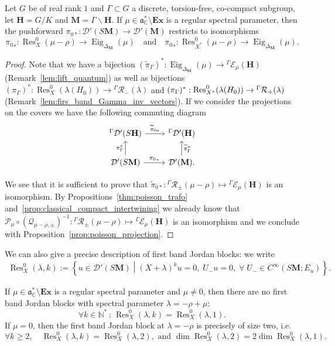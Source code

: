 \documentclass[AHL, Unicode, longabstracts, published]{cedram}
\DeclareMathOperator{\Res}{Res}
\DeclareMathOperator{\Eig}{Eig}
\newcommand{\mc}{\mathcal}
\newcommand{\cc}{\mathbb{C}}
\newcommand{\bfh}{\mathbf{H}}
\newcommand{\bfm}{\mathbf{M}}
\newcommand{\til}{\widetilde}
\newcommand{\N}{\mathbb{N}}
\renewcommand{\a}{\mathfrak a}
\let\oldforall\forall
\renewcommand*{\forall}{\mathrel{\oldforall}}
\begin{document}
\begin{theo}\label{thm:intertwining}
Let $G$ be of real rank $1$ and $\Gamma\subset G$ a discrete, torsion-free, co-compact subgroup, let ${\bfh}=G/K$ and ${\bfm}=\Gamma\backslash {\bfh}$. If $\mu \in \a^*_\cc\setminus\mathbf{Ex}$ is a regular spectral parameter, then the pushforward $\pi_{0*}:\mathcal D'(S{\bfm})\to\mathcal D'({\bfm})$ restricts to isomorphisms
\begin{equation}\label{isompi0}
{\pi_0}_*:\Res^0_{X}(\mu-\rho)\to \Eig_{\Delta_{\bfm}}(\mu)
\quad
\text{and}
\quad {\pi_0}_*:\Res^0_{X^*}(\mu-\rho)\to \Eig_{\Delta_{\bfm}}(\mu).
\end{equation}
\end{theo}

\begin{proof}
Note that we have a bijection $(\til\pi_{\Gamma})^*: \Eig_{\Delta_{\bfm}}(\mu)\to{^\Gamma \mathcal E_\mu({\bfh})}$ (Remark~\ref{lem:lift_quantum}) as well as bijections $(\pi_{\Gamma})^*:\Res_{X}^0(\lambda(H_0)) \to {^\Gamma \mc{R}_-(\lambda)} $ and $(\pi_{\Gamma})^*:\Res_{X^*}^0(\lambda(H_0))\linebreak\to {^\Gamma \mc{R}_+(\lambda)}$ (Remark~\ref{lem:firs_band_Gamma_inv_vectors}). If we consider the projections on the covers we have the following commuting diagram
\[
\begin{tikzcd} ^\Gamma\mathcal D'(S{\bfh}) \arrow{r}{\til{\pi}_{0*}} & ^\Gamma\mathcal D'({\bfh}) \\
\mathcal D'(S{\bfm}) \arrow{u}{\pi_{\Gamma}^*}\arrow{r}{{\pi_0}_*} & \mathcal D'({\bfm})\arrow[swap]{u}{\til\pi_{\Gamma}^*}.
\end{tikzcd}
\]


We see that it is sufficient to prove that $\til{\pi}_{0*}: {^\Gamma \mc{R}_\pm(\mu-\rho)}\mapsto {^\Gamma \mathcal E_\mu({\bfh})}$ is an isomorphism. By Propositions~\ref{thm:poisson_trafo} and~\ref{prop:classical_compact_intertwining} we already know that $\mathcal P_\mu \circ(\mathcal Q_{\mu-\rho,\pm})^{-1}: {^\Gamma \mc{R}_\pm(\mu-\rho)}\mapsto {^\Gamma \mathcal E_\mu({\bfh})}$ is an isomorphism and we conclude with Proposition~\ref{prop:poisson_projection}.
\end{proof}


We can also give a precise description of first band Jordan blocks: we write
\begin{align*}
\Res_{X}^0(\lambda, k):= \left\{u\in \mathcal D'(S{\bfm})\middle| (X+\lambda)^ku=0,\;U_-u=0,\;\forall\;U_- \in C^\infty(S{\bfm};E_u)\right\}.
\end{align*}
\begin{theo}\label{thm:jordan}
If $\mu\in \a^*_\cc\setminus \mathbf{Ex}$ is a regular spectral parameter and $\mu \neq0$, then there are no first band Jordan blocks with spectral parameter $\lambda = -\rho+\mu$:
\[
\forall k\in \N^*\,:\,\Res_{X}^0(\lambda, k) = \Res_{X}^0(\lambda, 1).
\]
If $\mu=0$, then the first band Jordan block at $\lambda = -\rho$ is precisely of size two, i.e.
\[
\forall k\geq 2, \quad
\Res_{X}^0(\lambda, k) = \Res_{ X}^0(\lambda, 2),
\text{ and }
\dim \Res_{X}^0(\lambda, 2) =2 \dim\Res_{X}^0(\lambda, 1).
\]
\end{theo}
\end{document}

